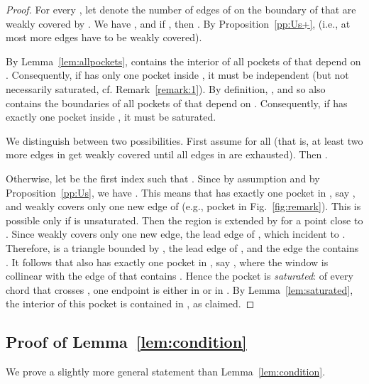\documentclass[12pt]{article}
\begin{document}
\begin{proof}
For every , let  denote the number of edges of  on the boundary of  that are weakly covered by . We have , and if , then .
By Proposition~\ref{pp:Us+},   (i.e., at most  more edges
have to be weakly covered).

By Lemma~\ref{lem:allpockets},  contains the interior of all pockets of  that depend on . Consequently, if  has only one pocket inside , it must be independent (but not necessarily saturated, cf. Remark~\ref{remark:1}). By definition, , and so  also contains the boundaries of all pockets of  that depend on . Consequently, if  has exactly one pocket inside , it must be saturated.

We distinguish between two possibilities. First assume  for all  (that is, at least two more edges in  get weakly covered until all edges in  are exhausted). Then .

Otherwise, let  be the first index such that . Since  by assumption and  by Proposition~\ref{pp:Us}, we have . This means that  has exactly one pocket in , say , and  weakly covers only one new edge of  (e.g., pocket  in Fig.~\ref{fig:remark}). This is possible only if  is unsaturated. Then the region  is extended by  for a point  close to . Since  weakly covers only one new edge, the lead edge of , which incident to . Therefore,  is a triangle bounded by , the lead edge of , and the edge the contains . It follows that  also has exactly one pocket in , say , where the window  is collinear with the edge of  that contains . Hence the pocket  is \emph{saturated}:
of every chord that crosses , one endpoint is either in  or in . By Lemma~\ref{lem:saturated}, the interior of this pocket is contained in , as claimed.
\end{proof}


\subsection{Proof of Lemma~\ref{lem:condition}}
We prove a slightly more general statement than Lemma~\ref{lem:condition}.
\end{document}
